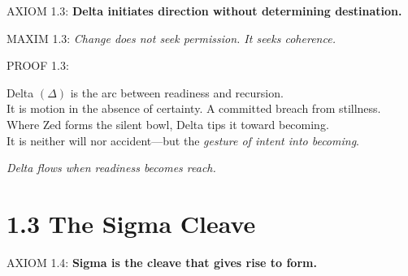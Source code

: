 
\noindent
AXIOM 1.3: \textbf{Delta initiates direction without determining destination.}

\noindent
MAXIM 1.3: \textit{Change does not seek permission. It seeks coherence.}

\noindent
PROOF 1.3:

Delta $(\Delta)$ is the arc between readiness and recursion.\\
It is motion in the absence of certainty. A committed breach from stillness.\\
Where Zed forms the silent bowl, Delta tips it toward becoming.\\

It is neither will nor accident---but the \textit{gesture of intent into becoming}.\\

\begin{tcolorbox}[colback=GentleGray!10, colframe=OriaBlue, title=\textbf{Diagram: Delta Flow Arc}, sharp corners=south]
\begin{center}
\end{center}
\end{tcolorbox}

\noindent
\textit{Delta flows when readiness becomes reach.}

\section*{1.3 The Sigma Cleave}


\noindent
AXIOM 1.4: \textbf{Sigma is the cleave that gives rise to form.}

